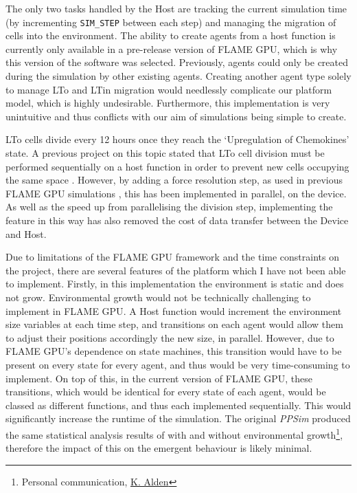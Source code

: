 \documentclass{UoYCSproject}
\begin{document}
The only two tasks handled by the \gls{Host} are tracking the current simulation time (by incrementing \texttt{SIM\_STEP} between each step) and managing the migration of cells into the environment.
The ability to create agents from a host function is currently only available in a pre-release version of \gls{FLAME GPU}, which is why this version of the software was selected.
Previously, agents could only be created during the simulation by other existing agents.
Creating another agent type solely to manage \gls{LTo} and \gls{LTin} migration would needlessly complicate our platform model, which is highly undesirable.
Furthermore, this implementation is very unintuitive and thus conflicts with our aim of simulations being simple to create.

\gls{LTo} cells divide every 12 hours once they reach the `Upregulation of Chemokines' state.
A previous project on this topic stated that \gls{LTo} cell division must be performed sequentially on a host function in order to prevent new cells occupying the same space \cite{phil_diss}.
However, by adding a force resolution step, as used in previous \gls{FLAME GPU} simulations \cite{flame_keratinocyte}, this has been implemented in parallel, on the device.
As well as the speed up from parallelising the division step, implementing the feature in this way has also removed the cost of data transfer between the \gls{Device} and \gls{Host}.

Due to limitations of the \gls{FLAME GPU} framework and the time constraints on the project, there are several features of the \gls{platform} which I have not been able to implement.
Firstly, in this implementation the environment is static and does not grow.
Environmental growth would not be technically challenging to implement in \gls{FLAME GPU}.
A \gls{Host} function would increment the environment size variables at each time step, and transitions on each agent would allow them to adjust their positions accordingly the new size, in parallel.
However, due to \gls{FLAME GPU}'s dependence on state machines, this transition would have to be present on every state for every agent, and thus would be very time-consuming to implement.
On top of this, in the current version of \gls{FLAME GPU}, these transitions, which would be identical for every state of each agent, would be classed as different functions, and thus each implemented sequentially.
This would significantly increase the runtime of the simulation.
The original \textit{PPSim} produced the same statistical analysis results of with and without environmental growth\footnote{Personal communication, \href{https://www.york.ac.uk/computational-immunology/members/kieran/}{K. Alden}}, therefore the impact of this on the emergent behaviour is likely minimal.
\end{document}
